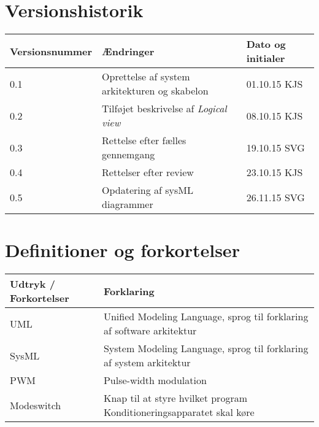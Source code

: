 	\section{Versionshistorik}
	\begin{longtable}{ |p{} |p{}| p{}|  } 
		\hline
		\rowcolor{usDef}
		\textbf{Versionsnummer} &  \textbf{Ændringer} & \textbf{Dato og initialer} \\
		\hline
		0.1 &  Oprettelse af system arkitekturen og skabelon & 01.10.15 KJS \\
		\hline
		0.2 & Tilføjet beskrivelse af \textit{Logical view} & 08.10.15 KJS \\
		\hline
		0.3 & Rettelse efter fælles gennemgang & 19.10.15 SVG \\
		\hline
		0.4 & Rettelser efter review & 23.10.15 KJS \\
		\hline
		0.5 & Opdatering af sysML diagrammer  & 26.11.15 SVG \\
		\hline
	\end{longtable}

	\section{Definitioner og forkortelser}
	\begin{longtable}{ |p{} |p{}| } 
		\hline
		\rowcolor{usDef}
		\textbf{Udtryk / Forkortelser} &  \textbf{Forklaring} \\
		\hline
		UML & Unified Modeling Language, sprog til forklaring af software arkitektur \\
		\hline
		SysML & System Modeling Language, sprog til forklaring af system arkitektur \\
		\hline
		PWM & Pulse-width modulation \\
		\hline
		Modeswitch & Knap til at styre hvilket program Konditioneringsapparatet skal køre \\
		\hline
	\end{longtable}
